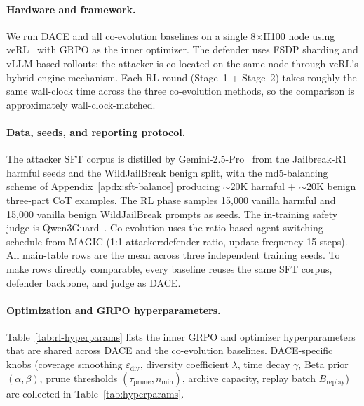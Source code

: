 \documentclass{article}
\newcommand{\method}{\textsc{DACE}\xspace}
\begin{document}
\paragraph{Hardware and framework.}
We run \method and all co-evolution baselines on a single 8$\times$H100 node using veRL~\citep{sheng2025verl} with GRPO as the inner optimizer. The defender uses FSDP sharding and vLLM-based rollouts; the attacker is co-located on the same node through veRL's hybrid-engine mechanism. Each RL round (Stage~1 + Stage~2) takes roughly the same wall-clock time across the three co-evolution methods, so the comparison is approximately wall-clock-matched.

\paragraph{Data, seeds, and reporting protocol.}
The attacker SFT corpus is distilled by Gemini-2.5-Pro~\citep{comanici2025gemini} from the Jailbreak-R1 harmful seeds and the WildJailBreak benign split, with the md5-balancing scheme of Appendix~\ref{apdx:sft-balance} producing $\sim$20K harmful + $\sim$20K benign three-part CoT examples. The RL phase samples 15{,}000 vanilla harmful and 15{,}000 vanilla benign WildJailBreak prompts as seeds. The in-training safety judge is Qwen3Guard~\citep{zhao2025qwen3guard}. Co-evolution uses the ratio-based agent-switching schedule from MAGIC (1:1 attacker:defender ratio, update frequency 15 steps). All main-table rows are the mean across three independent training seeds. To make rows directly comparable, every baseline reuses the same SFT corpus, defender backbone, and judge as \method.

\paragraph{Optimization and GRPO hyperparameters.}
Table~\ref{tab:rl-hyperparams} lists the inner GRPO and optimizer hyperparameters that are shared across \method and the co-evolution baselines. \method-specific knobs (coverage smoothing $\varepsilon_{\mathrm{div}}$, diversity coefficient $\lambda$, time decay $\gamma$, Beta prior $(\alpha, \beta)$, prune thresholds $(\tau_{\mathrm{prune}}, n_{\min})$, archive capacity, replay batch $B_{\mathrm{replay}}$) are collected in Table~\ref{tab:hyperparams}.
\end{document}
